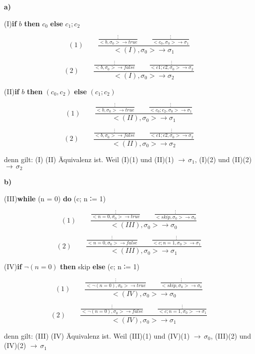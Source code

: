 \documentclass[fleqn]{article}
\begin{document}
\noindent\textbf{a)}

(I)\qquad\textbf{if} $b$ \textbf{then} $c_0$ \textbf{else} $c_1;c_2$

$$(1)\qquad\frac{\frac{\vdots}{<b,\sigma_0>\rightarrow true}\qquad\frac{\vdots}{<c_0,\sigma_0>\rightarrow\sigma_1}}{<(I),\sigma_0>\rightarrow\sigma_1}$$

$$(2)\qquad\frac{\frac{\vdots}{<b,\sigma_0>\rightarrow false}\qquad\frac{\vdots}{<c1;c2,\sigma_0>\rightarrow\sigma_2}}{<(I),\sigma_0>\rightarrow\sigma_2}$$




(II)\qquad\textbf{if} $b$ \textbf{then} $(c_0,c_2)$ \textbf{else} $(c_1;c_2)$

$$(1)\qquad\frac{\frac{\vdots}{<b,\sigma_0>\rightarrow true}\qquad\frac{\vdots}{<c_0;c_2,\sigma_0>\rightarrow\sigma_1}}{<(II),\sigma_0>\rightarrow\sigma_1}$$

$$(2)\qquad\frac{\frac{\vdots}{<b,\sigma_0>\rightarrow false}\qquad\frac{\vdots}{<c1;c2,\sigma_0>\rightarrow\sigma_2}}{<(II),\sigma_0>\rightarrow\sigma_2}$$

denn gilt: (I) (II) Äquivalenz ist. Weil (I)(1) und (II)(1) $\rightarrow\,\sigma_1$, (I)(2) und (II)(2) $\rightarrow\,\sigma_2$

\noindent\textbf{b)}

(III)\qquad\textbf{while} (n = 0) \textbf{do} (c; n ∶= 1) 

$$(1)\qquad\frac{\frac{\vdots}{<n=0,\sigma_0>\rightarrow true}\qquad\frac{\vdots}{<skip,\sigma_0>\rightarrow \sigma_0}}{<(III),\sigma_0>\rightarrow\sigma_0}$$

$$(2)\qquad\frac{\frac{\vdots}{<n=0,\sigma_0>\rightarrow false}\qquad\frac{\vdots}{<c;n=1,\sigma_0>\rightarrow\sigma_1}}{<(III),\sigma_0>\rightarrow\sigma_1}$$

(IV)\qquad\textbf{if} $¬(n = 0)$ \textbf{then} skip \textbf{else} (c; n ∶= 1)

$$(1)\qquad\frac{\frac{\vdots}{<\neg(n=0),\sigma_0>\rightarrow true}\qquad\frac{\vdots}{<skip,\sigma_0>\rightarrow \sigma_0}}{<(IV),\sigma_0>\rightarrow\sigma_0}$$

$$(2)\qquad\frac{\frac{\vdots}{<\neg(n=0),\sigma_0>\rightarrow false}\qquad\frac{\vdots}{<c;n=1,\sigma_0>\rightarrow \sigma_1}}{<(IV),\sigma_0>\rightarrow\sigma_1}$$

denn gilt: (III) (IV) Äquivalenz ist. Weil (III)(1) und (IV)(1) $\rightarrow\,\sigma_0$, (III)(2) und (IV)(2) $\rightarrow\,\sigma_1$
\end{document}

